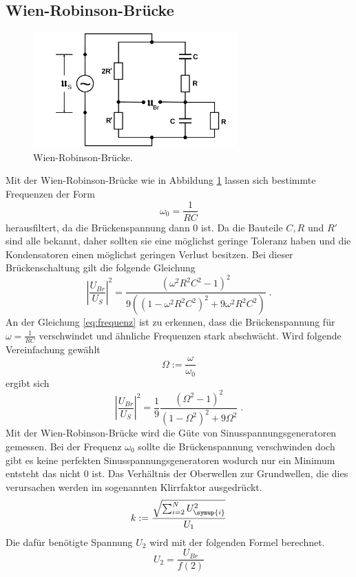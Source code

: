 \subsection{Wien-Robinson-Brücke}
\begin{figure}
  \centering
  \includegraphics[width=0.7\textwidth]{Bilder/Wien_Robinsonbruecke.png}
  \caption{Wien-Robinson-Brücke\cite{sample}.}
  \label{fig:WBBruecke}
\end{figure}
Mit der Wien-Robinson-Brücke wie in Abbildung \ref{fig:WBBruecke} lassen sich
 bestimmte Frequenzen der Form
\begin{equation}
\omega_0=\frac{1}{RC}
\end{equation}
herausfiltert, da die Brückenspannung dann $0$ ist. Da die Bauteile $C,R$ und $R'$
sind alle bekannt, daher sollten sie eine möglichst geringe Toleranz haben und
die Kondensatoren einen möglichst geringen Verlust besitzen. Bei dieser
Brückenschaltung gilt die folgende Gleichung
\begin{equation}
  \left|\frac{U_{Br}}{U_S}\right|^2=\frac{(\omega^2R^2C^2-1)^2}
  {9\left((1-\omega^2 R^2 C^2)^2+9\omega^2R^2C^2\right)} \;.
  \label{eq:frequenz}
\end{equation}
An der Gleichung \eqref{eq:frequenz} ist zu erkennen, dass die Brückenspannung
für $\omega=\frac{1}{RC}$ verschwindet und ähnliche Frequenzen stark abschwächt.
Wird folgende Vereinfachung gewählt
\begin{equation}
\Omega:=\frac{\omega}{\omega_0}
\end{equation}
ergibt sich
\begin{equation}
  \left|\frac{U_{Br}}{U_S}\right|^2=\frac{1}{9}\frac{(\Omega^2-1)^2}
  {(1-\Omega^2)^2+9\Omega^2}  \; .
\end{equation}
Mit der Wien-Robinson-Brücke wird die Güte von Sinusspannungsgeneratoren gemessen.
Bei der Frequenz $\omega_0$ sollte die Brückenspannung verschwinden doch gibt es
keine perfekten Sinusspannungsgeneratoren wodurch nur ein Minimum entsteht das nicht
$0$ ist. Das Verhältnis der Oberwellen zur Grundwellen, die dies verursachen werden
im sogenannten Klirrfaktor ausgedrückt.
\begin{equation}
k:=\frac{\sqrt{\sum_{i=2}^N U_\symup{i}^2}}{U_1}
 \label{eqn:klirr}
\end{equation}
Die dafür benötigte Spannung $U_2$ wird mit der folgenden Formel berechnet.
\begin{equation}
U_2=\frac{U_{Br}}{f(2)}
 \label{eqn:U2berechnung}
\end{equation}
